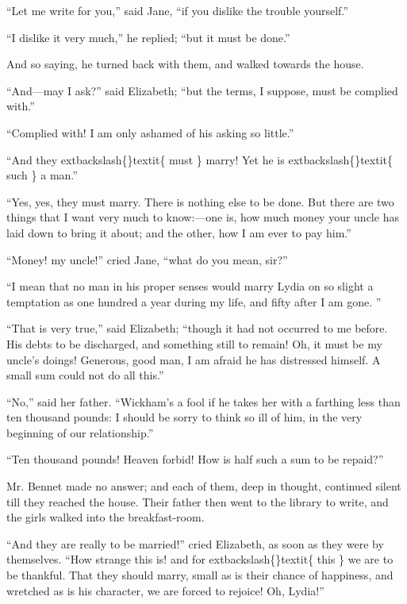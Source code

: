 \documentclass[10pt]{book}
\begin{document}
   “Let me write for you,” said Jane, “if you dislike the trouble
yourself.”
  

   “I dislike it very much,” he replied; “but it must be done.”
  

   And so saying, he turned back with them, and walked towards the house.
  

   “And—may I ask?” said Elizabeth; “but the terms, I suppose, must be
complied with.”
  

   “Complied with! I am only ashamed of his asking so little.”
  

   “And they
   	extbackslash\{\}textit\{
    must
   \}
   marry! Yet he is
   	extbackslash\{\}textit\{
    such
   \}
   a man.”
  

   “Yes, yes, they must marry. There is nothing else to be done. But there
are two things that I want very much to know:—one is, how much money
your uncle has laid down to bring it about; and the other, how I am ever
to pay him.”
  

   “Money! my uncle!” cried Jane, “what do you mean, sir?”
  

   “I mean that no man in his proper senses would marry Lydia on so slight
a temptation as one hundred a year during my life, and fifty after I am
gone.
   ”
  

   “That is very true,” said Elizabeth; “though it had not occurred to me
before. His debts to be discharged, and something still to remain! Oh,
it must be my uncle’s doings! Generous, good man, I am afraid he has
distressed himself. A small sum could not do all this.”
  

   “No,” said her father. “Wickham’s a fool if he takes her with a farthing
less than ten thousand pounds: I should be sorry to think so ill of him,
in the very beginning of our relationship.”
  

   “Ten thousand pounds! Heaven forbid! How is half such a sum to be
repaid?”
  

   Mr. Bennet made no answer; and each of them, deep in thought, continued
silent till they reached the house. Their father then went to the
library to write, and the girls walked into the breakfast-room.
  

   “And they are really to be married!” cried Elizabeth, as soon as they
were by themselves. “How strange this is! and for
   	extbackslash\{\}textit\{
    this
   \}
   we are to be
thankful. That they should marry, small as is their chance of happiness,
and wretched as is his character, we are forced to rejoice! Oh, Lydia!”
  
\end{document}
